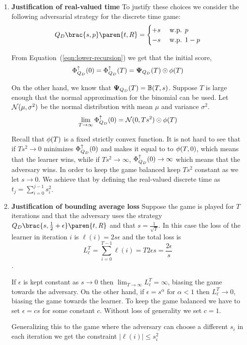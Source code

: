 \documentclass{article}[12pt]
\begin{document}
\begin{enumerate}
  \item {\bf Justification of real-valued time}
To justify these choices we consider the following adversarial
strategy for the discrete time game:
\begin{equation} \label{eqn:adv-strat-s}
  \adversMd \brac{s,p} \paren{t,R} =
  \begin{cases}
    +s & \mbox{ w.p. } p\\
    -s & \mbox{ w.p. } 1-p\\
  \end{cases}
\end{equation}

From Equation~(\ref{eqn:lower-recursion}) we get that the initial
score,
\[
  \Phi_{Q_D}^{\uparrow}(0) = \Phi_{Q_D}^{\uparrow}(T)={\bf \Psi}_{Q_D}(T) \odot \phi(T)
\]

On the other hand, we know that  ${\bf \Psi}_{Q_D}(T) =
\mathbb{B}(T,s)$. Suppose $T$ is large enough that the normal approximation for the
binomial can be used. Let ${\cal N}(\mu,\sigma^2)$ be the normal
distribution with mean $\mu$ and variance $\sigma^2$.
\begin{equation}   \label{eqn:largeTlimit}
  \lim_{T \to \infty} \Phi_{Q_D}^{\uparrow}(0) =  {\cal N}(0,Ts^2) \odot \phi(T)
\end{equation}

Recall that $\phi(T)$ is a fixed strictly convex function. It is not
hard to see that if $Ts^2 \to 0$ minimizes  $\Phi_{Q_D}^{\uparrow}(0)$ and
makes it equal to to $\phi(T,0)$, which means that the learner wins,
while if $Ts^2 \to \infty$, $\Phi_{Q_D}^{\uparrow}(0) \to \infty$ which means
that the adversary wins. In order to keep the game balanced
keep $Ts^2$ constant as we let $s \to 0$. We achieve that by defining
the real-valued discrete time as $t_j = \sum_{i=0}^{j-1} s_i^2$.

\item {\bf Justification of bounding average loss} Suppose the game is
  played for $T$ iterations and that the adversary uses the strategy
  $\adversMd\brac{s,\frac{1}{2}+\epsilon}\paren{t,\R}$ and that
  $s=\frac{1}{\sqrt{T}}$. In this case the loss of the learner in
  iteration $i$ is $\ell(i)=2s\epsilon$ and the total loss is
    $$L_\ell^T=\sum_{i=0}^{T-1} \ell(i) = T 2 \epsilon s = \frac{2 \epsilon}{s}$$.

    If $\epsilon$ is kept constant as $s \to 0$
    then $\lim_{T \to \infty}L_\ell^T=\infty$, biasing the game towards the adversary. On the other
    hand, if $\epsilon =s^{\alpha}$ for $\alpha<1$ then $L_\ell^T
    \to 0$, biasing the game towards the learner. To keep the game
    balanced we have to set $\epsilon=cs$ for some constant
    $c$. Without loss of generality we set $c=1$.

    Generalizing this to the game where the adversary can choose a
    different $s_i$ in each iteration we get the constraint 
    $|\ell(i)| \leq s_i^2$
\end{enumerate}
\end{document}
